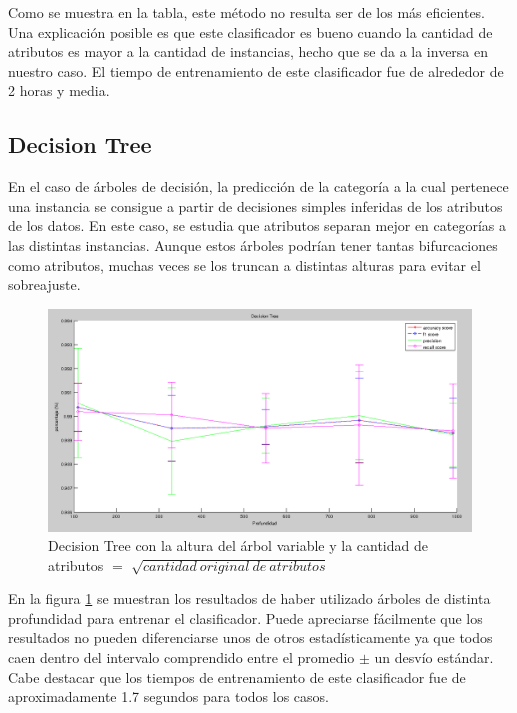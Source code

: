 \documentclass{article}
\begin{document}
Como se muestra en la tabla, este método no resulta ser de los más eficientes. Una explicación posible es que este clasificador es bueno cuando la cantidad de atributos es mayor a la cantidad de instancias, hecho que se da a la inversa en nuestro caso. El tiempo de entrenamiento de este clasificador fue de alrededor de 2 horas y media.

\subsection{Decision Tree}

En el caso de árboles de decisión, la predicción de la categoría a la cual pertenece una instancia se consigue a partir de decisiones simples inferidas de los atributos de los datos. En este caso, se estudia que atributos separan mejor en categorías a las distintas instancias. Aunque estos árboles podrían tener tantas bifurcaciones como atributos, muchas veces se los truncan a distintas alturas para evitar el sobreajuste.

\begin{figure}[H] %
\begin{center}
\includegraphics[width=500pt]{decisionTreeScores.png}
\caption{Decision Tree con la altura del árbol variable y la cantidad de atributos $=$ $\sqrt{cantidad\ original\ de\ atributos}$}
\label{DecisionTree}
\end{center}
\end{figure}

En la figura \ref{DecisionTree} se muestran los resultados de haber utilizado árboles de distinta profundidad para entrenar el clasificador. Puede apreciarse fácilmente que los resultados no pueden diferenciarse unos de otros estadísticamente ya que todos caen dentro del intervalo comprendido entre el promedio $\pm$ un desvío estándar. Cabe destacar que los tiempos de entrenamiento de este clasificador fue de aproximadamente 1.7 segundos para todos los casos.
\end{document}
